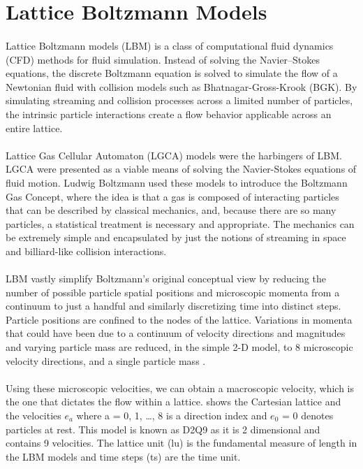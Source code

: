 \section{Lattice Boltzmann Models}
\label{LBS}

\paragraph{}Lattice Boltzmann models (LBM) is a class of computational fluid dynamics (CFD) methods for fluid simulation. Instead of solving the Navier–Stokes equations, the discrete Boltzmann equation is solved to simulate the flow of a Newtonian fluid with collision models such as Bhatnagar-Gross-Krook (BGK). By simulating streaming and collision processes across a limited number of particles, the intrinsic particle interactions create a flow behavior applicable across an entire lattice.

\paragraph{}Lattice Gas Cellular Automaton (LGCA) models were the harbingers of LBM. LGCA were presented as a viable means of solving the Navier-Stokes equations of fluid motion. Ludwig Boltzmann used these models to introduce the Boltzmann Gas Concept, where the idea is that a gas is composed of interacting particles that can be described by classical mechanics, and, because there are so many particles, a statistical treatment is necessary and appropriate. The mechanics can be extremely simple and encapsulated by just
the notions of streaming in space and billiard-like collision interactions.

\paragraph{}LBM vastly simplify Boltzmann’s original conceptual view by reducing the number of possible particle spatial positions and microscopic momenta from a continuum to just a handful and similarly discretizing time into distinct steps. Particle positions are confined to the nodes of the lattice. Variations in momenta that could have been due to a continuum of velocity directions and magnitudes and varying particle mass are reduced, in the simple 2-D model, to 8 microscopic velocity directions, and a single particle mass \citep{sukop2006lattice}. 

\paragraph{}Using these microscopic velocities, we can obtain a macroscopic velocity, which is the one that dictates the flow within a lattice.  shows the Cartesian lattice and the velocities $e_a$ where a = 0, 1, \dots , 8 is a direction index and $e_0$ = 0 denotes particles at rest. This model is known as D2Q9 as it is 2 dimensional and contains 9 velocities. The lattice unit (lu) is the fundamental measure of length in the LBM models and time steps (ts) are the time unit. 

